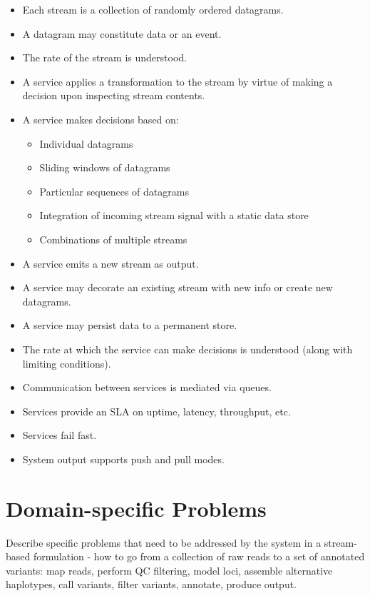 \begin{itemize}
 \item Each stream is a collection of randomly ordered datagrams.
 \item A datagram may constitute data or an event.
 \item The rate of the stream is understood.
 \item A service applies a transformation to the stream by virtue of making a decision upon inspecting stream contents.
 \item A service makes decisions based on:
 \begin{itemize}
    \item Individual datagrams
    \item Sliding windows of datagrams
    \item Particular sequences of datagrams
    \item Integration of incoming stream signal with a static data store
    \item Combinations of multiple streams
 \end{itemize}
 \item A service emits a new stream as output.
 \item A service may decorate an existing stream with new info or create new datagrams.
 \item A service may persist data to a permanent store.
 \item The rate at which the service can make decisions is understood (along with limiting conditions).
 \item Communication between services is mediated via queues.
 \item Services provide an SLA on uptime, latency, throughput, etc.
 \item Services fail fast.
 \item System output supports push and pull modes.
\end{itemize}
\section{Domain-specific Problems}

Describe specific problems that need to be addressed by the system in a stream-based formulation - how to go from a collection of raw reads to a set of annotated variants: map reads, perform QC filtering, model loci, assemble alternative haplotypes, call variants, filter variants, annotate, produce output.  


